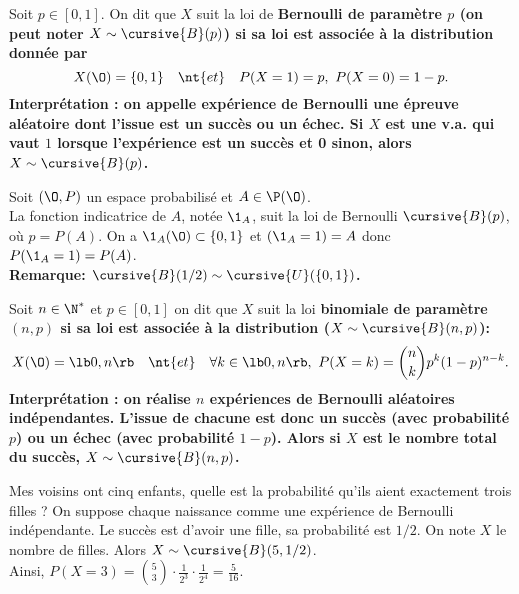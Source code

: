 \documentclass[11pt]{article}
\begin{document}
\begin{defi}{}{}
    Soit $p\in[0,1]$. On dit que $X$ suit la loi de \bf{Bernoulli} de paramètre $p$ (on peut noter $X\sim\cursive{B}(p)$) si sa loi est associée à la distribution donnée par
    \begin{equation*}
        X(\O)=\{0,1\} \quad \nt{et} \quad P(X=1)=p, ~ P(X=0)=1-p.
    \end{equation*} 
    Interprétation : on appelle expérience de Bernoulli une épreuve aléatoire dont l'issue est un succès ou un échec. Si $X$ est une v.a. qui vaut $1$ lorsque l'expérience est un succès et 0 sinon, alors $X\sim\cursive{B}(p)$.
\end{defi}

\begin{prop}{}{}
    Soit $(\O,P)$ un espace probabilisé et $A\in\P(\O)$.\\
    La fonction indicatrice de $A$, notée $\1_A$, suit la loi de Bernoulli $\cursive{B}(p)$, où $p=P(A)$.
    \tcblower
    On a $\1_A(\O)\subset\{0,1\}$ et $(\1_A=1)=A$ donc $P(\1_A=1)=P(A)$.\\
    \bf{Remarque:} $\cursive{B}(1/2)\sim\cursive{U}(\{0,1\})$.
\end{prop}

\begin{defi}{}{}
    Soit $n\in\N^*$ et $p\in[0,1]$ on dit que $X$ suit la loi \bf{binomiale} de paramètre $(n,p)$ si sa loi est associée à la distribution ($X\sim\cursive{B}(n,p)$):
    \begin{equation*}
        X(\O)=\lb0,n\rb \quad \nt{et} \quad \forall k \in \lb0,n\rb, ~ P(X=k)=\binom{n}{k}p^k(1-p)^{n-k}.
    \end{equation*}
    Interprétation : on réalise $n$ expériences de Bernoulli aléatoires indépendantes. L'issue de chacune est donc un succès (avec probabilité $p$) ou un échec (avec probabilité $1-p$). Alors si $X$ est le nombre total du succès, $X\sim\cursive{B}(n,p)$.
\end{defi}

\begin{ex}{}{}
    Mes voisins ont cinq enfants, quelle est la probabilité qu'ils aient exactement trois filles ?
    \tcblower
    On suppose chaque naissance comme une expérience de Bernoulli indépendante. Le succès est d'avoir une fille, sa probabilité est $1/2$. On note $X$ le nombre de filles. Alors $X\sim\cursive{B}(5,1/2)$.\\
    Ainsi, $P(X=3)=\binom{5}{3}\cdot\frac{1}{2^3}\cdot\frac{1}{2^4}=\frac{5}{16}$.
\end{ex}
\end{document}

